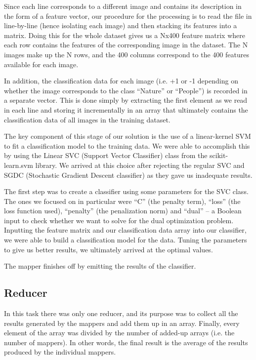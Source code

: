 \documentclass[a4paper, 11pt]{article}
\begin{document}
Since each line corresponds to a different image and contains its description in the form of a feature vector, our procedure for the processing is to read the file in line-by-line (hence isolating each image) and then stacking its features into a matrix. Doing this for the whole dataset gives us a Nx400 feature matrix where each row contains the features of the corresponding image in the dataset. The N images make up the N rows, and the 400 columns correspond to the 400 features available for each image.

In addition, the classification data for each image (i.e. +1 or -1 depending on whether the image corresponds to the class “Nature” or “People”) is recorded in a separate vector. This is done simply by extracting the first element as we read in each line and storing it incrementally in an array that ultimately contains the classification data of all images in the training dataset.

The key component of this stage of our solution is the use of a linear-kernel SVM to fit a classification model to the training data. We were able to accomplish this by using the Linear SVC (Support Vector Classifier) class from the scikit-learn.svm library. We arrived at this choice after rejecting the regular SVC and SGDC (Stochastic Gradient Descent classifier) as they gave us inadequate results.

The first step was to create a classifier using some parameters for the SVC class. The ones we focused on in particular were “C” (the penalty term), “loss” (the loss function used), “penalty” (the penalization norm) and “dual” – a Boolean input to check whether we want to solve for the dual optimization problem. Inputting the feature matrix and our classification data array into our classifier, we were able to build a classification model for the data. Tuning the parameters to give us better results, we ultimately arrived at the optimal values.

The mapper finishes off by emitting the results of the classifier.

\subsection*{Reducer}
In this task there was only one reducer, and its purpose was to collect all the results generated by the mappers and add them up in an array. Finally, every element of the array was divided by the number of added-up arrays (i.e. the number of mappers). In other words, the final result is the average of the results produced by the individual mappers.
\end{document}
